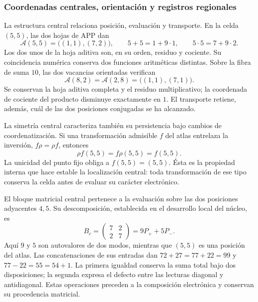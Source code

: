 \subsubsection{Coordenadas centrales, orientación y registros regionales}
\label{el-centro:registros}

La estructura central relaciona posición, evaluación y transporte. En la
celda \((5,5)\), las dos hojas de APP dan
\begin{equation}
 \mathcal A(5,5)=\bigl((1,1),(7,2)\bigr),\qquad
 5+5=1+9\cdot1,\qquad5\cdot5=7+9\cdot2.
 \label{el-centro:app}
\end{equation}
Los dos unos de la hoja aditiva son, en su orden, residuo y cociente.
Su coincidencia numérica conserva dos funciones aritméticas distintas.
Sobre la fibra de suma \(10\), las dos vacancias orientadas verifican
\begin{equation}
 \mathcal A(8,2)=\mathcal A(2,8)=\bigl((1,1),(7,1)\bigr).
 \label{el-centro:vacancias}
\end{equation}
Se conservan la hoja aditiva completa y el residuo multiplicativo;
la coordenada de cociente del producto disminuye exactamente en
\(1\). El transporte retiene, además, cuál de las dos posiciones
conjugadas se ha alcanzado.



La simetría central caracteriza también su persistencia bajo cambios de
coordenatización. Si una transformación admisible \(f\) del atlas entrelaza la
inversión, \(f\rho=\rho f\), entonces
\[
 \rho f(5,5)=f\rho(5,5)=f(5,5).
\]
La unicidad del punto fijo obliga a \(f(5,5)=(5,5)\). Ésta es la
propiedad interna que hace estable la localización central: toda
transformación de ese tipo conserva la celda antes de evaluar su
carácter electrónico.

El bloque matricial central pertenece a la evaluación sobre las dos
posiciones adyacentes \(4,5\). Su descomposición, establecida en el
desarrollo local del núcleo, es
\[
 B_c=\begin{pmatrix}7&2\\2&7\end{pmatrix}=9P_++5P_-.
\]
Aquí \(9\) y \(5\) son autovalores de dos modos, mientras que
\((5,5)\) es una posición del atlas. Las concatenaciones de sus
entradas dan \(72+27=77+22=99\) y
\(77-22=55=54+1\). La primera igualdad conserva la suma total bajo
dos disposiciones; la segunda expresa el defecto entre las lecturas
diagonal y antidiagonal. Estas operaciones preceden a la composición
electrónica y conservan su procedencia matricial.

